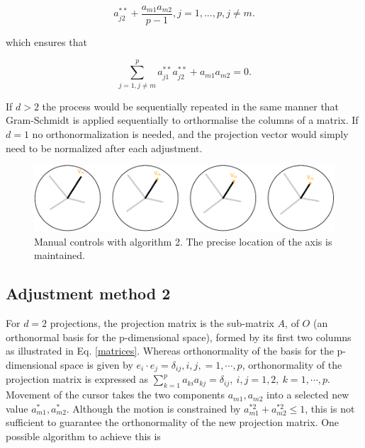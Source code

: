 \documentclass[]{interact}
\theoremstyle{plain}%
\theoremstyle{definition}
\theoremstyle{remark}
\begin{document}
\[a^{**}_{j2}+\frac{a_{m1}a_{m2}}{p-1}, j=1, ..., p, j\neq m.\]

which ensures that

\[\sum_{j=1, j\neq m}^p a^{**}_{j1}a^{**}_{j2} + a_{m1}a_{m2} = 0.\]

If \(d>2\) the process would be sequentially repeated in the same manner
that Gram-Schmidt is applied sequentially to orthormalise the columns of
a matrix. If \(d=1\) no orthonormalization is needed, and the projection
vector would simply need to be normalized after each adjustment.

\begin{figure}
\includegraphics[width=1\linewidth]{appendix_files/figure-latex/othermethod-1} \caption{Manual controls with algorithm 2. The precise location of the axis is maintained.}\label{fig:othermethod}
\end{figure}

\hypertarget{adjustment-method-2}{%
\subsection{Adjustment method 2}\label{adjustment-method-2}}

For \(d=2\) projections, the projection matrix is the sub-matrix \(A\),
of \(O\) (an orthonormal basis for the p-dimensional space), formed by
its first two columns as illustrated in Eq. \ref{matrices}. Whereas
orthonormality of the basis for the p-dimensional space is given by
\(e_i\cdot e_j=\delta_{ij},{i,j,=1,\cdots, p}\), orthonormality of the
projection matrix is expressed as
\(\sum_{k=1}^p a_{ki} a_{kj}=\delta_{ij}, ~{i,j=1,2}, ~{k=1,\cdots,p}\).
Movement of the cursor takes the two components \({a_{m1},a_{m2}}\) into
a selected new value \({a^*_{m1},a^*_{m2}}\). Although the motion is
constrained by \(a^{*2}_{m1}+a^{*2}_{m2}\leq 1\), this is not sufficient
to guarantee the orthonormality of the new projection matrix. One
possible algorithm to achieve this is
\end{document}
